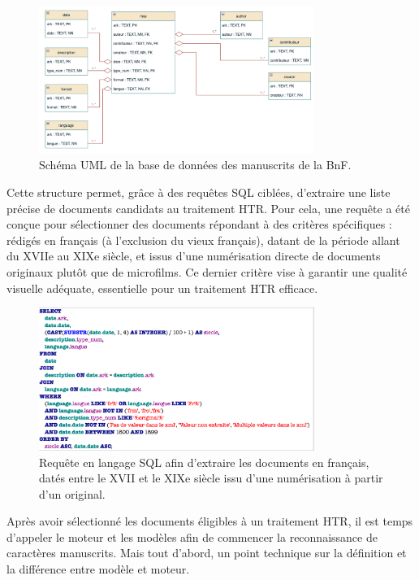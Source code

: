 \documentclass[a4paper,12pt,twoside]{book}
\begin{document}
	\begin{figure}[h!]
		\centering
		\includegraphics[width=0.8\textwidth]{images/schema_uml_db_mss_bnf.png}
		\caption{Schéma UML de la base de données des manuscrits de la BnF.}
		\label{fig:monimage}
	\end{figure}
	
	Cette structure permet, grâce à des requêtes SQL ciblées, d'extraire une liste précise de documents candidats au traitement HTR. Pour cela, une requête a été conçue pour sélectionner des documents répondant à des critères spécifiques : rédigés en français (à l'exclusion du vieux français), datant de la période allant du XVIIe au XIXe siècle, et issus d'une numérisation directe de documents originaux plutôt que de microfilms. Ce dernier critère vise à garantir une qualité visuelle adéquate, essentielle pour un traitement HTR efficace.  
	\\
	\begin{figure}[h!]
		\centering
		\includegraphics[width=0.8\textwidth]{images/requete_sql.png}
		\caption{Requête en langage SQL afin d’extraire les documents en français, datés entre le XVII et le XIXe siècle issu d’une numérisation à partir d’un original.}
		\label{fig:monimage}
	\end{figure}
	
	Après avoir sélectionné les documents éligibles à un traitement HTR, il est temps d’appeler le moteur et les modèles afin de commencer la reconnaissance de caractères manuscrits. Mais tout d’abord, un point technique sur la définition et la différence entre modèle et moteur. 
	\\
	
\end{document}
